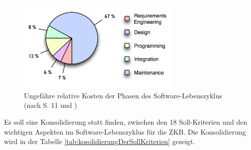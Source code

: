   \begin{figure}[ht]
    \begin{center}
      \includegraphics[width=0.7\textwidth]{./image/softwareLifeCycleCost.png}
      \caption{Ungefähre relative Kosten der Phasen des Software-Lebenszyklus
      (nach \cite{SoftwareEngineering} S. 11 und
      \cite{SoftwareLifeCycleModels})}
      \label{img:softwareLifecycleCost}
    \end{center}
  \end{figure}
  
  Es soll eine Konsolidierung statt finden, zwischen den 18 Soll-Kriterien und
  den wichtigen Aspekten im Software-Lebenszyklus für die \ac{ZKB}. Die
  Konsolidierung wird in der Tabelle \ref{tab:kosolidierungDerSollKriterien}
  gezeigt.
  
